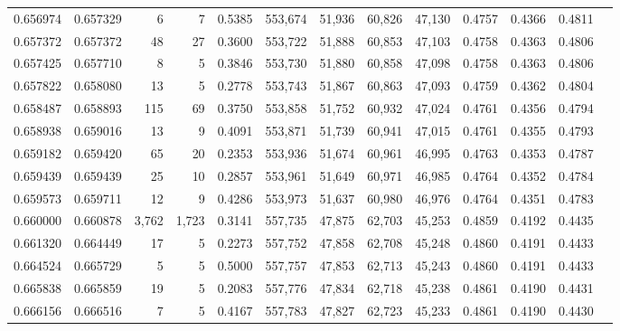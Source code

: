\begin{tabular}{rrrrrrrrrrrrr}
0.656974 & 0.657329 &      6 &     7 &                                     0.5385 & 553,674 &  51,936 &  60,826 &  47,130 & 0.4757 & 0.4366 & 0.4811 \\
0.657372 & 0.657372 &     48 &    27 &                                     0.3600 & 553,722 &  51,888 &  60,853 &  47,103 & 0.4758 & 0.4363 & 0.4806 \\
0.657425 & 0.657710 &      8 &     5 &                                     0.3846 & 553,730 &  51,880 &  60,858 &  47,098 & 0.4758 & 0.4363 & 0.4806 \\
0.657822 & 0.658080 &     13 &     5 &                                     0.2778 & 553,743 &  51,867 &  60,863 &  47,093 & 0.4759 & 0.4362 & 0.4804 \\
0.658487 & 0.658893 &    115 &    69 &                                     0.3750 & 553,858 &  51,752 &  60,932 &  47,024 & 0.4761 & 0.4356 & 0.4794 \\
0.658938 & 0.659016 &     13 &     9 &                                     0.4091 & 553,871 &  51,739 &  60,941 &  47,015 & 0.4761 & 0.4355 & 0.4793 \\
0.659182 & 0.659420 &     65 &    20 &                                     0.2353 & 553,936 &  51,674 &  60,961 &  46,995 & 0.4763 & 0.4353 & 0.4787 \\
0.659439 & 0.659439 &     25 &    10 &                                     0.2857 & 553,961 &  51,649 &  60,971 &  46,985 & 0.4764 & 0.4352 & 0.4784 \\
0.659573 & 0.659711 &     12 &     9 &                                     0.4286 & 553,973 &  51,637 &  60,980 &  46,976 & 0.4764 & 0.4351 & 0.4783 \\
0.660000 & 0.660878 &  3,762 & 1,723 &                                     0.3141 & 557,735 &  47,875 &  62,703 &  45,253 & 0.4859 & 0.4192 & 0.4435 \\
0.661320 & 0.664449 &     17 &     5 &                                     0.2273 & 557,752 &  47,858 &  62,708 &  45,248 & 0.4860 & 0.4191 & 0.4433 \\
0.664524 & 0.665729 &      5 &     5 &                                     0.5000 & 557,757 &  47,853 &  62,713 &  45,243 & 0.4860 & 0.4191 & 0.4433 \\
0.665838 & 0.665859 &     19 &     5 &                                     0.2083 & 557,776 &  47,834 &  62,718 &  45,238 & 0.4861 & 0.4190 & 0.4431 \\
0.666156 & 0.666516 &      7 &     5 &                                     0.4167 & 557,783 &  47,827 &  62,723 &  45,233 & 0.4861 & 0.4190 & 0.4430 \\

\end{tabular}
